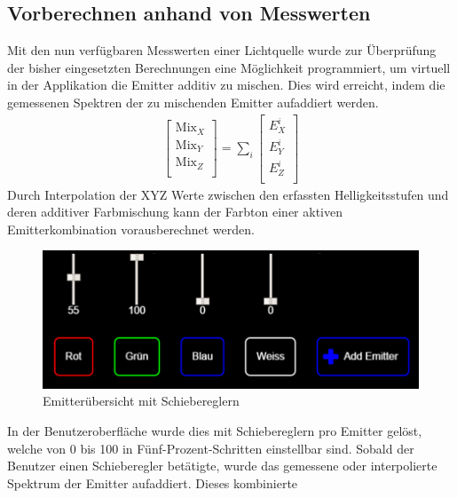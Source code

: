 \documentclass[11pt]{scrartcl}
\begin{document}
\subsection{Vorberechnen anhand von Messwerten}\label{calcColor}
Mit den nun verfügbaren Messwerten einer Lichtquelle wurde zur Überprüfung der bisher eingesetzten Berechnungen eine Möglichkeit programmiert,
um virtuell in der Applikation die Emitter additiv zu mischen. Dies wird erreicht, indem die gemessenen Spektren der zu mischenden Emitter aufaddiert werden.
\begin{align}\label{Equ:22}
    \left[ \begin{array}{r}
        \text{Mix}_X \\
        \text{Mix}_Y \\
        \text{Mix}_Z \\
    \end{array}\right]
    = \sum_{i} \left[ \begin{array}{r}
        E^i_X \\
        E^i_Y \\
        E^i_Z \\
    \end{array}\right]
\end{align}
Durch Interpolation der XYZ Werte zwischen den erfassten Helligkeitsstufen und deren additiver Farbmischung kann der Farbton einer aktiven Emitterkombination
vorausberechnet werden.
\begin{figure}[H]
    \begin{center}
        \includegraphics[width=.9\textwidth]{images/app_emitters_with_sliders_v1.png}
    \end{center}
    \vspace{-.3cm}
    \caption{Emitterübersicht mit Schiebereglern}\label{fig:emitterFaders}
\end{figure}
\noindent
In der Benutzeroberfläche wurde dies mit Schiebereglern pro Emitter gelöst, welche von 0 bis 100 in Fünf-Prozent-Schritten einstellbar sind.
Sobald der Benutzer einen Schieberegler betätigte, wurde das gemessene oder interpolierte Spektrum der Emitter aufaddiert. Dieses kombinierte
\end{document}
